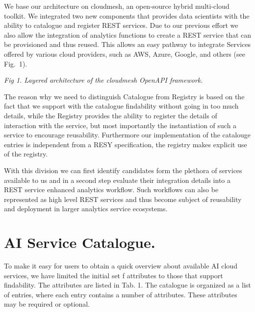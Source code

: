 \documentclass[A0,6pt]{article}
\begin{document}
\begin{multicols}{3}
We base our architecture on cloudmesh, an open-source hybrid multi-cloud toolkit. We integrated two new components that provides data scientists with the ability to catalogue and register REST services. Due to our previous effort we also allow the integration of analytics functions to create a REST service that can be provisioned and thus reused. This allows an easy pathway to integrate Services offered by various cloud providers, such as AWS, Azure, Google, and others (see Fig.~1).  

\begin{center}
\end{center}
\vspace{-12pt}
{\em Fig 1. Layered architecture of the cloudmesh Open\-API framework.}

The reason why we need to distinguish Catalogue from Registry is based on the fact that we support with the catalogue findability without going in too much details, while the Registry provides the ability to register the details of interaction with the service, but most importantly the instantiation of such a service to encourage reusability. Furthermore our implementation of the catalouge entries is independent from a RESY specification, the registry makes explicit use of the registry. 

With this division we can first identify candidates form the plethora of services available to us and in a second step evaluate their integration details into a REST service enhanced analytics workflow. Such workflows can also be represented as high level REST services and thus become subject of reusability and deployment in larger analytics service ecosystems. 


\section*{AI Service Catalogue.}
To make it easy for users to obtain a quick overview about available AI cloud services, we have limited the initial set f attributes to those that support findability. The attributes are listed in Tab. 1. The catalogue is organized as a list of entries, where each entry contains a number of attributes. These attributes may be required or optional. 


\end{multicols}
\end{document}
